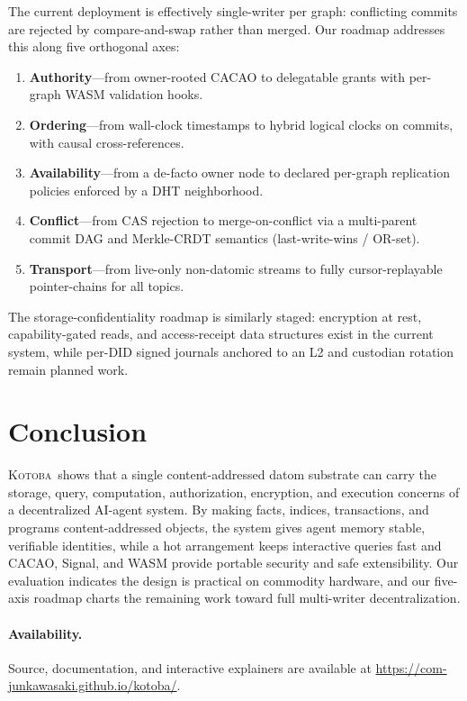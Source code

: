 \documentclass[11pt]{article}
\newcommand{\kotoba}{\textsc{Kotoba}}
\begin{document}
The current deployment is effectively single-writer per graph: conflicting
commits are rejected by compare-and-swap rather than merged. Our roadmap
addresses this along five orthogonal axes:
%
\begin{enumerate}[leftmargin=1.4em,itemsep=2pt]
  \item \textbf{Authority}---from owner-rooted CACAO to delegatable grants with
    per-graph WASM validation hooks.
  \item \textbf{Ordering}---from wall-clock timestamps to hybrid logical clocks
    on commits, with causal cross-references.
  \item \textbf{Availability}---from a de-facto owner node to declared
    per-graph replication policies enforced by a DHT neighborhood.
  \item \textbf{Conflict}---from CAS rejection to merge-on-conflict via a
    multi-parent commit DAG and Merkle-CRDT semantics (last-write-wins / OR-set).
  \item \textbf{Transport}---from live-only non-datomic streams to fully
    cursor-replayable pointer-chains for all topics.
\end{enumerate}
%
The storage-confidentiality roadmap is similarly staged: encryption at rest,
capability-gated reads, and access-receipt data structures exist in the current
system, while per-DID signed journals anchored to an L2 and custodian rotation
remain planned work.

\section{Conclusion}
\label{sec:conclusion}

\kotoba\ shows that a single content-addressed datom substrate can carry the
storage, query, computation, authorization, encryption, and execution concerns of
a decentralized AI-agent system. By making facts, indices, transactions, and
programs content-addressed objects, the system gives agent memory stable,
verifiable identities, while a hot arrangement keeps interactive queries fast
and CACAO, Signal, and WASM provide portable security and safe extensibility.
Our evaluation indicates the design is practical on commodity hardware, and our
five-axis roadmap charts the remaining work toward full multi-writer
decentralization.

\paragraph{Availability.}
Source, documentation, and interactive explainers are available at
\url{https://com-junkawasaki.github.io/kotoba/}.



\end{document}

